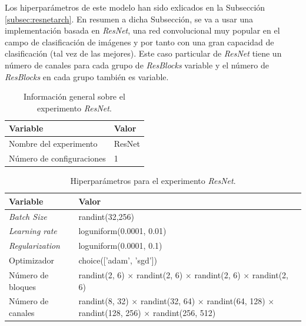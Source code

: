 Los hiperparámetros de este modelo han sido exlicados en la Subsección \ref{subsec:resnetarch}. En resumen a dicha Subsección, se va a usar una implementación basada en \textit{ResNet}, una red convolucional muy popular en el campo de clasificación de imágenes y por tanto con una gran capacidad de clasificación (tal vez de las mejores). Este caso particular de \textit{ResNet} tiene un número de canales para cada grupo de \textit{ResBlocks} variable y el número de \textit{ResBlocks} en cada grupo también es variable.\\

\begin{table}[H]
\centering
\begin{tabular}[c]{m{6cm}m{3cm}}
\hline
\textbf{Variable}                 & \textbf{Valor}  \\ \hline
Nombre del experimento            & ResNet          \\
Número de configuraciones         & 1               \\ \hline
\end{tabular}
\caption{Información general sobre el experimento \textit{ResNet}.}
\label{tab:resnetinfo}
\end{table}

\begin{table}[H]
\centering
\begin{tabular}{m{3cm}m{7cm}}
\hline
\textbf{Variable}                 & \textbf{Valor}                          \\ \hline
\textit{Batch Size}               & randint(32,256)                         \\
\textit{Learning rate}            & loguniform(0.0001, 0.01)                \\
\textit{Regularization}           & loguniform(0.0001, 0.1)                 \\
Optimizador                       & choice(['adam', 'sgd'])                 \\ 
Número de bloques                 & randint(2, 6) $\times$ randint(2, 6) $\times$ randint(2, 6) $\times$ randint(2, 6) \\
Número de canales                 & randint(8, 32) $\times$ randint(32, 64) $\times$ randint(64, 128) $\times$ randint(128, 256) $\times$ randint(256, 512) \\
\hline
\end{tabular}
\caption{Hiperparámetros para el experimento \textit{ResNet}.}
\label{tab:resnetconfig}
\end{table}

